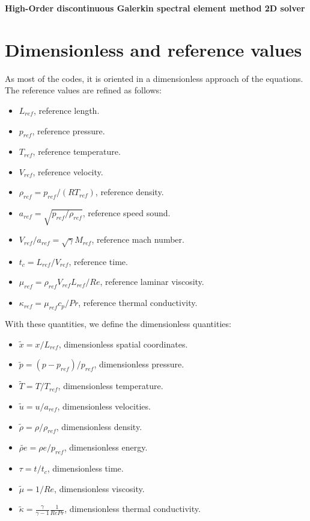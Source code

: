 \documentclass[10pt,a4paper]{article}
\begin{document}
\begin{center}
	\textbf{High-Order discontinuous Galerkin spectral element method 2D solver}\\
	\hrulefill
	\tableofcontents
	\hrulefill
\end{center}

\section{Dimensionless and reference values}

As most of the codes, it is oriented in a dimensionless approach of the equations. The reference values are refined as follows:

\begin{itemize}
	\item $L_{ref}$, reference length.
	\item $p_{ref}$, reference pressure.
	\item $T_{ref}$, reference temperature.
	\item $V_{ref}$, reference velocity. 
	\item $\rho_{ref} = p_{ref} / (RT_{ref})$, reference density.
	\item $a_{ref} = \sqrt{p_{ref} / \rho_{ref}}$, reference speed sound.
	\item $V_{ref}/a_{ref}=\sqrt{\gamma}M_{ref}$, reference mach number.
	\item $t_c = L_{ref} / V_{ref}$, reference time.
	\item $\mu_{ref} = \rho_{ref} V_{ref} L_{ref} / Re$, reference laminar viscosity.
	\item $\kappa_{ref} = \mu_{ref} c_p / Pr$, reference thermal conductivity.
\end{itemize}

With these quantities, we define the dimensionless quantities:

\begin{itemize}
	\item $\tilde{x} = x / L_{ref}$, dimensionless spatial coordinates.
	\item $\tilde{p} = (p-p_{ref}) / p_{ref}$, dimensionless pressure.
	\item $\tilde{T} = T / T_{ref}$, dimensionless temperature.
	\item $\tilde{u} = u / a_{ref}$, dimensionless velocities.
	\item $\tilde{\rho} = \rho / \rho_{ref}$, dimensionless density.
	\item $\tilde{\rho e} = \rho e / p_{ref}$, dimensionless energy.
	\item $\tau = t / t_c$, dimensionless time.
	\item $\tilde{\mu} = 1/Re$, dimensionless viscosity.
	\item $\tilde{\kappa} = \frac{\gamma}{\gamma-1}\frac{1}{RePr}$, dimensionless thermal conductivity.
\end{itemize}
\end{document}
